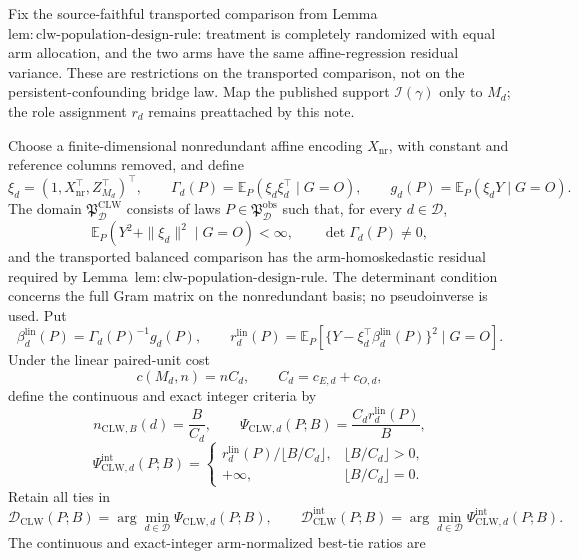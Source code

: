 Fix the source-faithful transported comparison from Lemma~\(\mathrm{lem{:}clw\text{-}population\text{-}design\text{-}rule}\): treatment is completely randomized with equal arm allocation, and the two arms have the same affine-regression residual variance.  These are restrictions on the transported comparison, not on the persistent-confounding bridge law.  Map the published support \(\mathcal I(\gamma)\) only to \(M_d\); the role assignment \(r_d\) remains preattached by this note.

Choose a finite-dimensional nonredundant affine encoding \(X_{\mathrm{nr}}\), with constant and reference columns removed, and define
\[
 \xi_d=(1,X_{\mathrm{nr}}^\top,Z_{M_d}^\top)^\top,
 \qquad
 \Gamma_d(P)=\mathbb E_P(\xi_d\xi_d^\top\mid G=O),
 \qquad
 g_d(P)=\mathbb E_P(\xi_dY\mid G=O).                       \tag{1}
\]
The domain \(\mathfrak P_{\mathcal D}^{\mathrm{CLW}}\) consists of laws \(P\in\mathfrak P_{\mathcal D}^{\mathrm{obs}}\) such that, for every \(d\in\mathcal D\),
\[
 \mathbb E_P(Y^2+\|\xi_d\|^2\mid G=O)<\infty,
 \qquad \det\Gamma_d(P)\ne0,                              \tag{2}
\]
and the transported balanced comparison has the arm-homoskedastic residual required by Lemma~\(\mathrm{lem{:}clw\text{-}population\text{-}design\text{-}rule}\).  The determinant condition concerns the full Gram matrix on the nonredundant basis; no pseudoinverse is used.  Put
\[
 \beta_d^{\mathrm{lin}}(P)=\Gamma_d(P)^{-1}g_d(P),
 \qquad
 r_d^{\mathrm{lin}}(P)=
 \mathbb E_P\!\left[
 \{Y-\xi_d^\top\beta_d^{\mathrm{lin}}(P)\}^2\mid G=O
 \right].                                                   \tag{3}
\]
Under the linear paired-unit cost
\[
 c(M_d,n)=nC_d,
 \qquad C_d=c_{E,d}+c_{O,d},                                \tag{4}
\]
define the continuous and exact integer criteria by
\[
 n_{\mathrm{CLW},B}(d)=\frac{B}{C_d},
 \qquad
 \Psi_{\mathrm{CLW},d}(P;B)=\frac{C_dr_d^{\mathrm{lin}}(P)}{B}, \tag{5}
\]
\[
 \Psi_{\mathrm{CLW},d}^{\mathrm{int}}(P;B)=
 \begin{cases}
 r_d^{\mathrm{lin}}(P)/\lfloor B/C_d\rfloor,&\lfloor B/C_d\rfloor>0,\\
 +\infty,&\lfloor B/C_d\rfloor=0.
 \end{cases}                                                \tag{6}
\]
Retain all ties in
\[
 \mathcal D_{\mathrm{CLW}}(P;B)
 =\arg\min_{d\in\mathcal D}\Psi_{\mathrm{CLW},d}(P;B),
 \qquad
 \mathcal D_{\mathrm{CLW}}^{\mathrm{int}}(P;B)
 =\arg\min_{d\in\mathcal D}\Psi_{\mathrm{CLW},d}^{\mathrm{int}}(P;B). \tag{7}
\]
The continuous and exact-integer arm-normalized best-tie ratios are
